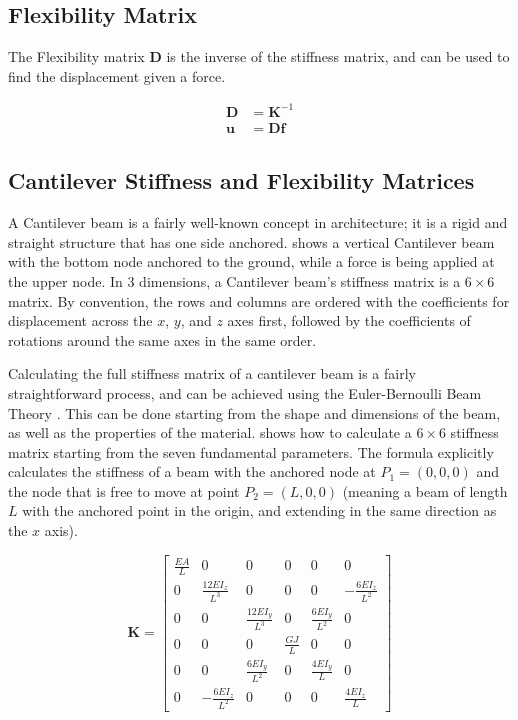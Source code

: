 \subsection{Flexibility Matrix}
\label{sec:flex_matrix}

The Flexibility matrix $\mathbf{D}$ is the inverse of the stiffness matrix,
and can be used to find the displacement given a force.

\begin{equation}
\begin{split}
    \mathbf{D} &= \mathbf{K}^{-1} \\
    \mathbf{u} &= \mathbf{D} \mathbf{f}
\end{split}
\label{for:flexibility}
\end{equation}



\subsection{Cantilever Stiffness and Flexibility Matrices}
\label{sec:cantilever_matrixes}

A Cantilever beam is a fairly well-known concept in architecture; it is a rigid and straight structure
that has one side anchored.  shows a vertical Cantilever beam with the
bottom node anchored to the ground, while a force is being applied at the upper node.
In 3 dimensions, a Cantilever beam's stiffness matrix is a $6 \times 6$ matrix.
By convention, the rows and columns are ordered with the coefficients for displacement across
the $x$, $y$, and $z$ axes first, followed by the coefficients of rotations around the same axes in the
same order.

Calculating the full stiffness matrix of a cantilever beam is a fairly straightforward process,
and can be achieved using the Euler-Bernoulli Beam Theory \cite{beam_theory}.
This can be done starting from the shape and dimensions of the beam, as well as the properties of the
material.
 shows how to calculate a $6 \times 6$ stiffness matrix starting
from the seven fundamental parameters. The formula explicitly calculates the
stiffness of a beam with the anchored node at $P_1=(0, 0, 0)$ and the node
that is free to move at point $P_2 = (L, 0, 0)$ (meaning a beam of length $L$ with
the anchored point in the origin, and extending in the same direction as the $x$ axis).


\begin{equation}
\mathbf{K} =
\begin{bmatrix}
\frac{EA}{L} & 0 & 0 & 0 & 0 & 0 \\
0 & \frac{12EI_z}{L^3} & 0 & 0 & 0 & -\frac{6EI_z}{L^2} \\
0 & 0 & \frac{12EI_y}{L^3} & 0 & \frac{6EI_y}{L^2} & 0 \\
0 & 0 & 0 & \frac{GJ}{L} & 0 & 0 \\
0 & 0 & \frac{6EI_y}{L^2} & 0 & \frac{4EI_y}{L} & 0 \\
0 & -\frac{6EI_z}{L^2} & 0 & 0 & 0 & \frac{4EI_z}{L}
\end{bmatrix}
\label{for:beam_formula}
\end{equation}

